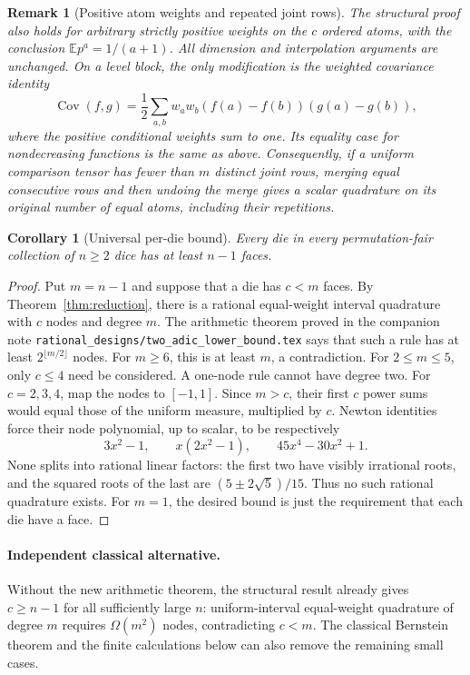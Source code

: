 \documentclass[11pt]{article}
\newtheorem{corollary}[theorem]{Corollary}
\newtheorem{remark}[theorem]{Remark}
\newcommand{\E}{\mathbb E}
\begin{document}
\begin{remark}[Positive atom weights and repeated joint rows]
The structural proof also holds for arbitrary strictly positive weights
on the $c$ ordered atoms, with the conclusion $\E p^a=1/(a+1)$.
All dimension and interpolation arguments are unchanged. On a level
block, the only modification is the weighted covariance identity
\[
 \operatorname{Cov}(f,g)
 =\frac12\sum_{a,b}w_aw_b(f(a)-f(b))(g(a)-g(b)),
\]
where the positive conditional weights sum to one. Its equality case
for nondecreasing functions is the same as above.
Consequently, if a uniform comparison tensor has fewer than $m$
distinct joint rows, merging equal consecutive rows and then undoing
the merge gives a scalar quadrature on its original number of equal
atoms, including their repetitions.
\end{remark}

\begin{corollary}[Universal per-die bound]
Every die in every permutation-fair collection of $n\geq2$ dice has at
least $n-1$ faces.
\end{corollary}
\begin{proof}
Put $m=n-1$ and suppose that a die has $c<m$ faces. By
Theorem~\ref{thm:reduction}, there is a rational equal-weight interval
quadrature with $c$ nodes and degree $m$. The arithmetic theorem proved
in the companion note \texttt{rational\_designs/two\_adic\_lower\_bound.tex}
says that such a rule has at least $2^{\lfloor m/2\rfloor}$ nodes.
For $m\geq6$, this is at least $m$, a contradiction.
For $2\leq m\leq5$, only $c\leq4$ need be considered. A one-node rule
cannot have degree two. For $c=2,3,4$, map the nodes to $[-1,1]$.
Since $m>c$, their first $c$ power sums would equal those of the uniform
measure, multiplied by $c$. Newton identities force their node polynomial,
up to scalar, to be respectively
\[
 3x^2-1,\qquad x(2x^2-1),\qquad45x^4-30x^2+1.
\]
None splits into rational linear factors: the first two have visibly
irrational roots, and the squared roots of the last are
$(5\pm2\sqrt5)/15$. Thus no such rational quadrature exists. For $m=1$,
the desired bound is just the requirement that each die have a face.
\end{proof}

\paragraph{Independent classical alternative.}
Without the new arithmetic theorem, the structural result already gives
$c\geq n-1$ for all sufficiently large $n$: uniform-interval equal-weight
quadrature of degree $m$ requires $\Omega(m^2)$ nodes, contradicting $c<m$.
The classical Bernstein theorem and the finite calculations below can also
remove the remaining small cases.
\end{document}

